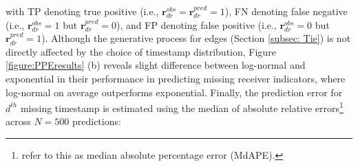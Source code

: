 \documentclass[ba]{imsart}
\numberwithin{equation}{section}
\theoremstyle{plain}
\begin{document}
	with TP denoting true positive (i.e., $\boldsymbol{r}^{obs}_{dr}=\boldsymbol{r}^{pred}_{dr}=1$), FN denoting false negative (i.e., $\boldsymbol{r}^{obs}_{dr}=1$ but $\boldsymbol{r}^{pred}_{dr}=0$), and FP denoting false positive (i.e., $\boldsymbol{r}^{obs}_{dr}=0$ but $\boldsymbol{r}^{pred}_{dr}=1$). Although the generative process for edges (Section \ref{subsec: Tie}) is not directly affected by the choice of timestamp distribution, Figure \ref{figure:PPEresults} (b) reveals slight difference between log-normal and exponential in their performance in predicting missing receiver indicators, where log-normal on average outperforms exponential. Finally, the prediction error for $d^{th}$ missing timestamp is estimated using the median of absolute relative errors\footnote{\cite{hyndman2006another} refer to this as median absolute percentage error (MdAPE).} across $N=500$ predictions:
\end{document}

